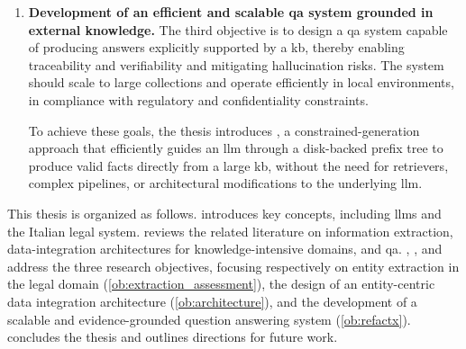 \begin{enumerate}[leftmargin=*,label=\textit{Obj.~\arabic*:},ref=\textit{Obj.~\arabic*}]
    \item \label{ob:refactx} \textbf{Development of an efficient and scalable \acl{qa} system grounded in external knowledge.}  
    The third objective is to design a \acl{qa} system capable of producing answers explicitly supported by a \acl{kb}, thereby enabling traceability and verifiability and mitigating hallucination risks. 
    The system should scale to large collections and operate efficiently in local environments, in compliance with regulatory and confidentiality constraints.  

    To achieve these goals, the thesis introduces , a constrained-generation approach that efficiently guides an \ac{llm} through a disk-backed prefix tree to produce valid facts directly from a large \acl{kb}, without the need for retrievers, complex pipelines, or architectural modifications to the underlying \ac{llm}.


\end{enumerate}

This \phd thesis is organized as follows. 
 introduces key concepts, including \aclp{llm} and the Italian legal system. 
 reviews the related literature on information extraction, data-integration architectures for knowledge-intensive domains, and \acl{qa}. 
, , and  address the three research objectives, focusing respectively on entity extraction in the legal domain (\ref{ob:extraction_assessment}), the design of an entity-centric data integration architecture (\ref{ob:architecture}), and the development of a scalable and evidence-grounded question answering system (\ref{ob:refactx}). 
 concludes the thesis and outlines directions for future work.











